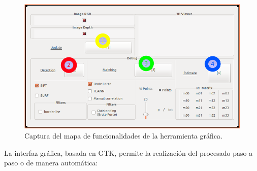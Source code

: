 \begin{figure}[th]
\centering
\includegraphics[scale=0.48]{Figures/super_gui.png}
\decoRule
\caption[supergui]{Captura del mapa de funcionalidades de la herramienta gráfica.}
\label{fig:supergui}
\end{figure}

La interfaz gráfica, basada en GTK, permite la realización  del procesado paso a paso o de manera automática: 

